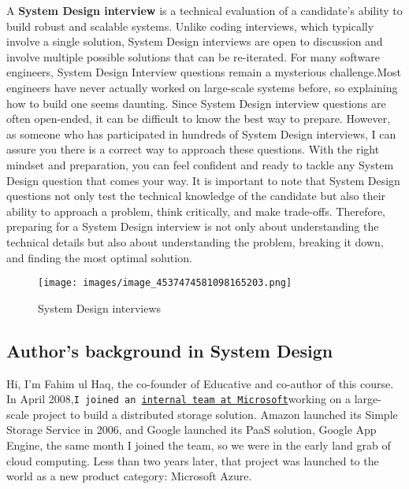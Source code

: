 

A \textbf{System Design interview} is a technical evaluation of a candidate's ability to build robust and scalable systems. Unlike coding interviews, which typically involve a single solution, System Design interviews are open to discussion and involve multiple possible solutions that can be re-iterated. For many software engineers, System Design Interview questions remain a mysterious challenge.Most engineers have never actually worked on large-scale systems before, so explaining how to build one seems daunting. Since System Design interview questions are often open-ended, it can be difficult to know the best way to prepare. However, as someone who has participated in hundreds of System Design interviews, I can assure you there is a correct way to approach these questions. With the right mindset and preparation, you can feel confident and ready to tackle any System Design question that comes your way. It is important to note that System Design questions not only test the technical knowledge of the candidate but also their ability to approach a problem, think critically, and make trade-offs. Therefore, preparing for a System Design interview is not only about understanding the technical details but also about understanding the problem, breaking it down, and finding the most optimal solution.

\begin{figure}[htbp]
    \centering
    \texttt{[image: images/image\_4537474581098165203.png]}
    \caption{System Design interviews}
\end{figure}

\subsection{Author's background in System Design}\label{gIyZLoEnzqAWz9PwuDQ-5}

Hi, I'm Fahim ul Haq, the co-founder of Educative and co-author of this course. In April 2008,\texttt{I joined an \href{https://www.educative.io/blog/25-years-of-developer-interviews}{internal team at Microsoft}}working on a large-scale project to build a distributed storage solution. Amazon launched its Simple Storage Service in 2006, and Google launched its PaaS solution, Google App Engine, the same month I joined the team, so we were in the early land grab of cloud computing. Less than two years later, that project was launched to the world as a new product category: Microsoft Azure.

